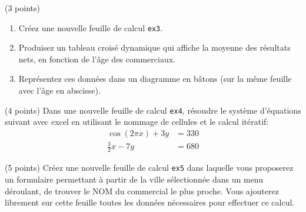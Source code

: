 \documentclass[a4paper]{article}
\begin{document}
\exost (3 points)
\begin{enumerate}
 \item Cr\'eez une nouvelle feuille de calcul \verb?ex3?.
 \item Produisez un tableau crois\'e dynamique qui affiche la moyenne des r\'esultats nets, en fonction de l'\^age des commerciaux. %
 \item Repr\'esentez ces donn\'ees dans un diagramme en b\^atons (sur la m\^eme feuille avec l'\^age en abscisse).  %
\end{enumerate}


\exost (4 points) Dans une nouvelle feuille de calcul \verb?ex4?, 
r\'esoudre le syst\`eme d'\'equations suivant avec excel en utilisant le nommage de cellules et le calcul it\'eratif: %
\begin{align}
 \cos(2\pi x)  + 3y	&= 330\\
 \frac{3}{2} x - 7y  	&= 680
\end{align}

\exost (5 points) Cr\'eez une nouvelle feuille de calcul \verb?ex5? dans laquelle vous proposerez un formulaire
permettant \`a partir de la ville s\'electionn\'ee dans un menu d\'eroulant, de trouver le NOM du commercial le plus proche. Vous ajouterez
librement sur cette feuille toutes les donn\'ees n\'ecessaires pour effectuer ce calcul.
\end{document}
